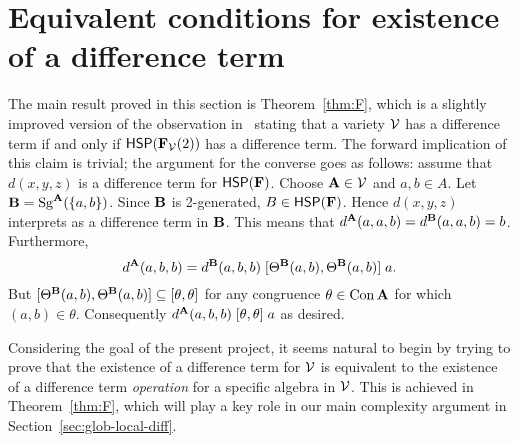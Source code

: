 

\section{Equivalent conditions for existence of a difference term}
\label{sec:equiv-cond-exist}
The main result proved in this section is Theorem~\ref{thm:F}, which 
is a slightly improved version of the observation
in~\cite{MR1358491}
stating that a variety $\mathcal{V}$ has a difference term if and only if
$\mathsf{H} \mathsf{S} \mathsf{P}(\mathbf{F}_{\mathcal{V}}(2))$ 
has a difference term.
The forward implication of this claim is trivial;
the argument for the converse goes as follows:
assume that $d(x, y, z)$ is a difference term for $\mathsf{H} \mathsf{S} \mathsf{P}(\mathbf{F})$.
Choose $\mathbf{A} \in \mathcal{V}$ and $a, b \in A$. Let $\mathbf{B} = \operatorname{Sg}^{\mathbf{A}} (\{a, b\})$.
Since $\mathbf{B}$ is 2-generated, $B \in \mathsf{H} \mathsf{S} \mathsf{P} (\mathbf{F})$.
Hence $d(x, y, z)$ interprets as a difference term in $\mathbf{B}$. This means that
$d^{\mathbf{A}} (a, a, b) = d^{\mathbf{B}} (a, a, b) = b$.
Furthermore,
\[
d^{\mathbf{A}} (a, b, b) = d^{\mathbf{B}} (a, b, b) \mathrel{[\Theta^{\mathbf{B}} (a, b), \Theta^{\mathbf{B}} (a, b)]} a.
\]
But $[\Theta^{\mathbf{B}} (a, b), \Theta^{\mathbf{B}} (a,b)]\subseteq [\theta, \theta]$ for any congruence
$\theta \in \operatorname{Con} \mathbf{A}$ for which $(a, b) \in \theta$. Consequently
$d^{\mathbf{A}} (a, b, b) \mathrel{[\theta, \theta]} a$ as desired.

Considering the goal of the present project, it seems natural
to begin by trying to prove that the existence of a difference term for
 $\mathcal{V}$ is equivalent to the  existence  of a difference term
\emph{operation} for a specific algebra in $\mathcal{V}$.  This is achieved in
Theorem~\ref{thm:F}, which will play a key role
in our main complexity argument in Section~\ref{sec:glob-local-diff}.

